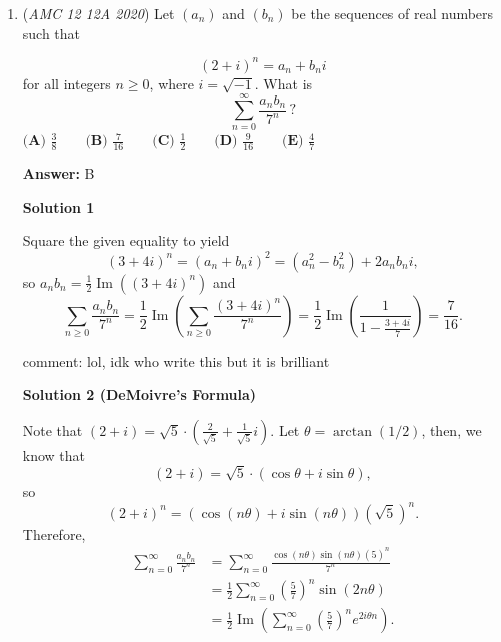 \begin{enumerate}
 Now we have $\text{lcm}(5!,n) = n$, implying that $5!\, |\, n$, and $n/5\, |\, 10!$. Writing out prime factorizations, this gives us

 
 \[2^3 \cdot 3 \cdot 5 \,|\, n\]
 \[n \,|\, 2^8 \cdot 3^4 \cdot 5^2 \cdot 7\]

 So $n$ can have 3, 4, 5, 6, 7, or 8 factors of 2; 1, 2, 3, or 4 factors of two; and 0 or 1 factors of 7. Note that $\text{gcd}(2^8 \cdot 3^4 \cdot 5^2 \cdot 7,n) = n/5$ implies that $n$ has 2 factors of 5. Thus, there are $6 \cdot 4 \cdot 2 = 48$ possible choices for $n$, and our answer is $\boxed{\textbf{(D) 48}}$.

 -gumbymoo

 


	\item (\textit{AMC 12 12A 2020}) Let $(a_n)$ and $(b_n)$ be the sequences of real numbers such that

 \[ (2 + i)^n = a_n + b_ni \]for all integers $n\geq 0$, where $i = \sqrt{-1}$. What is
 \[\sum_{n=0}^\infty\frac{a_nb_n}{7^n}\,?\]
$\textbf{(A) }\frac 38\qquad\textbf{(B) }\frac7{16}\qquad\textbf{(C) }\frac12\qquad\textbf{(D) }\frac9{16}\qquad\textbf{(E) }\frac47$

 \textbf{Answer: }B



\textbf{Solution 1}

Square the given equality to yield
 \[(3 + 4i)^n = (a_n + b_ni)^2 = (a_n^2 - b_n^2) + 2a_nb_ni,\]so $a_nb_n = \frac12\operatorname{Im}((3+4i)^n)$ and
 \[\sum_{n\geq 0}\frac{a_nb_n}{7^n} = \frac12\operatorname{Im}\left(\sum_{n\geq 0}\frac{(3+4i)^n}{7^n}\right) = \frac12\operatorname{Im}\left(\frac{1}{1 - \frac{3 + 4i}7}\right) = \boxed{\frac 7{16}}.\]

 comment: lol, idk who write this but it is brilliant

 



\textbf{Solution 2 (DeMoivre's Formula)}

Note that $(2+i) = \sqrt{5} \cdot \left(\frac{2}{\sqrt{5}} + \frac{1}{\sqrt{5}}i \right)$. Let $\theta = \arctan (1/2)$, then, we know that 
 \[(2+i) = \sqrt{5} \cdot \left( \cos \theta + i\sin \theta \right),\] so 
 \[(2+i)^n = (\cos (n \theta) + i\sin (n\theta))(\sqrt{5})^n.\] Therefore, 
 \begin{align*} \sum_{n=0}^\infty\frac{a_nb_n}{7^n} &= \sum_{n=0}^\infty\frac{\cos(n\theta)\sin(n\theta) (5)^n}{7^n} \\ &=\frac{1}{2}\sum_{n=0}^\infty \left( \frac{5}{7}\right)^n \sin (2n\theta)\\  &=\frac{1}{2} \operatorname{Im} \left( \sum_{n=0}^\infty \left( \frac{5}{7} \right)^ne^{2i\theta n} \right). \end{align*}



\end{enumerate}
